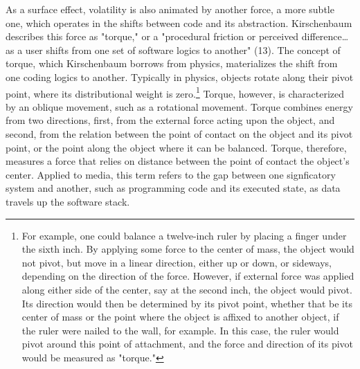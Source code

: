 \documentclass[11pt]{article}
\begin{document}
As a surface effect, volatility is also animated by another force, a
more subtle one, which operates in the shifts between code and its
abstraction.  Kirschenbaum describes this force as "torque," or a
"procedural friction or perceived difference\ldots{} as a user shifts from
one set of software logics to another" (13). The concept of torque,
which Kirschenbaum borrows from physics, materializes the shift from
one coding logics to another. Typically in physics, objects rotate
along their pivot point, where its distributional weight is
zero.\footnote{For example, one could balance a twelve-inch ruler by placing
a finger under the sixth inch. By applying some force to the center of
mass, the object would not pivot, but move in a linear direction,
either up or down, or sideways, depending on the direction of the
force. However, if external force was applied along either side of the
center, say at the second inch, the object would pivot. Its direction
would then be determined by its pivot point, whether that be its
center of mass or the point where the object is affixed to another
object, if the ruler were nailed to the wall, for example. In this
case, the ruler would pivot around this point of attachment, and the
force and direction of its pivot would be measured as "torque."} Torque, however, is characterized by an oblique movement,
such as a rotational movement. Torque combines energy from two
directions, first, from the external force acting upon the object, and
second, from the relation between the point of contact on the object
and its pivot point, or the point along the object where it can be
balanced. Torque, therefore, measures a force that relies on distance
between the point of contact the object's center. Applied to media,
this term refers to the gap between one signficatory system and
another, such as programming code and its executed state, as data
travels up the software stack.
\end{document}
